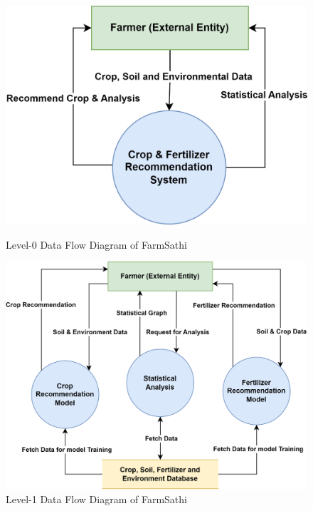 \documentclass{scrreprt}
\begin{document}
\begin{figure}
    \centering
    \includegraphics[width=0.7\linewidth]{Level_0_DFD.png}
    \caption{Level-0 Data Flow Diagram of FarmSathi}
    \label{fig:FarmSathi_DFD0}
    
    \vspace{1cm}
    
    \centering
    \includegraphics[width=1\linewidth]{Level_1_DFD.png}
    \caption{Level-1 Data Flow Diagram of FarmSathi}
    \label{fig:FarmSathi_DFD1}
    
\end{figure}
\end{document}
